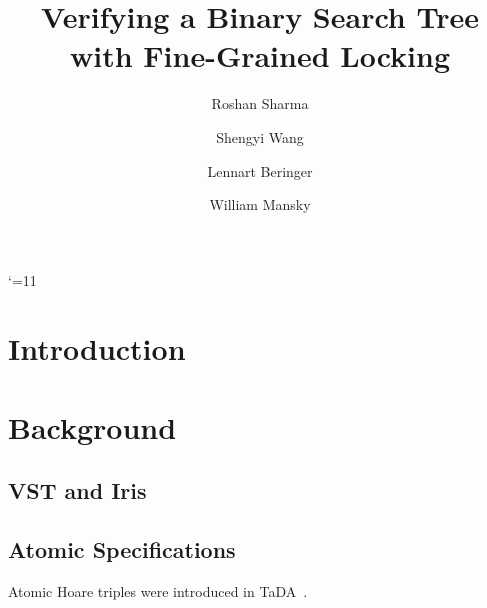 \documentclass[acmsmall,screen]{acmart}\settopmatter{printfolios=true}
\title{Verifying a Binary Search Tree with Fine-Grained Locking}
\author{Roshan Sharma}
\author{Shengyi Wang}
\author{Lennart Beringer}
\author{William Mansky}
\date{} %
\begin{document}
\maketitle

\catcode`\@=11
\section{Introduction}

\section{Background}
\subsection{VST and Iris}
\subsection{Atomic Specifications}
Atomic Hoare triples were introduced in TaDA~\cite{TaDA}.
\end{document}
